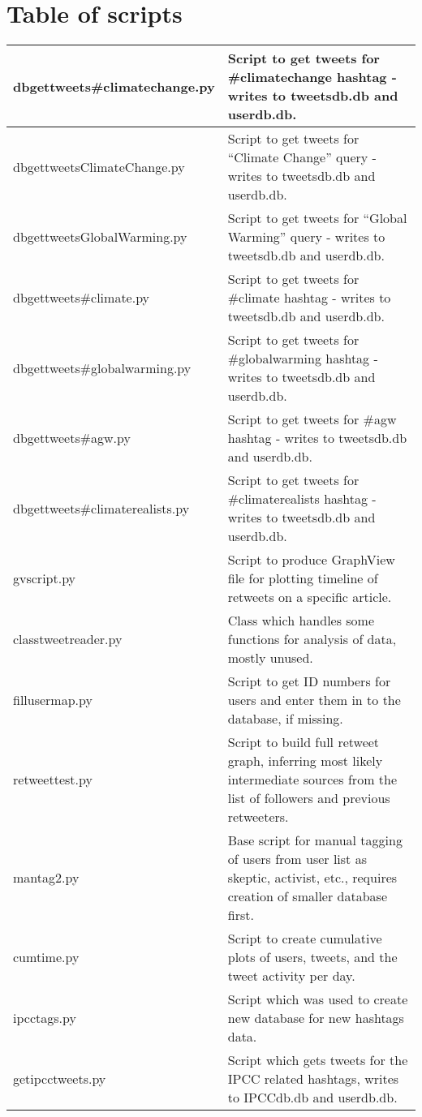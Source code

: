 \documentclass[paper=a4, fontsize=11pt]{scrartcl}
\numberwithin{equation}{section}		%
\numberwithin{figure}{section}			%
\numberwithin{table}{section}				%
\begin{document}
\section{Table of scripts}
\begin{tabular}{l | p{11cm}}
dbgettweets\#climatechange.py & Script to get tweets for \#climatechange hashtag - writes to tweetsdb.db and userdb.db.\\
\hline
dbgettweetsClimateChange.py & Script to get tweets for ``Climate Change'' query - writes to tweetsdb.db and userdb.db.\\\hline
dbgettweetsGlobalWarming.py & Script to get tweets for ``Global Warming'' query - writes to tweetsdb.db and userdb.db.\\\hline
dbgettweets\#climate.py & Script to get tweets for \#climate hashtag - writes to tweetsdb.db and userdb.db.\\\hline
dbgettweets\#globalwarming.py & Script to get tweets for \#globalwarming hashtag - writes to tweetsdb.db and userdb.db.\\\hline
dbgettweets\#agw.py & Script to get tweets for \#agw hashtag - writes to tweetsdb.db and userdb.db.\\\hline
dbgettweets\#climaterealists.py & Script to get tweets for \#climaterealists hashtag - writes to tweetsdb.db and userdb.db.\\\hline
gvscript.py & Script to produce GraphView file for plotting timeline of retweets on a specific article.\\\hline
classtweetreader.py & Class which handles some functions for analysis of data, mostly unused.\\\hline
fillusermap.py & Script to get ID numbers for users and enter them in to the database, if missing.\\\hline
retweettest.py & Script to build full retweet graph, inferring most likely intermediate sources from the list of followers and previous retweeters.\\\hline
mantag2.py & Base script for manual tagging of users from user list as skeptic, activist, etc., requires creation of smaller database first.\\\hline
cumtime.py & Script to create cumulative plots of users, tweets, and the tweet activity per day.\\\hline
ipcctags.py & Script which was used to create new database for new hashtags data.\\\hline
getipcctweets.py & Script which gets tweets for the IPCC related hashtags, writes to IPCCdb.db and userdb.db.\\\hline

\end{tabular}
\end{document}
